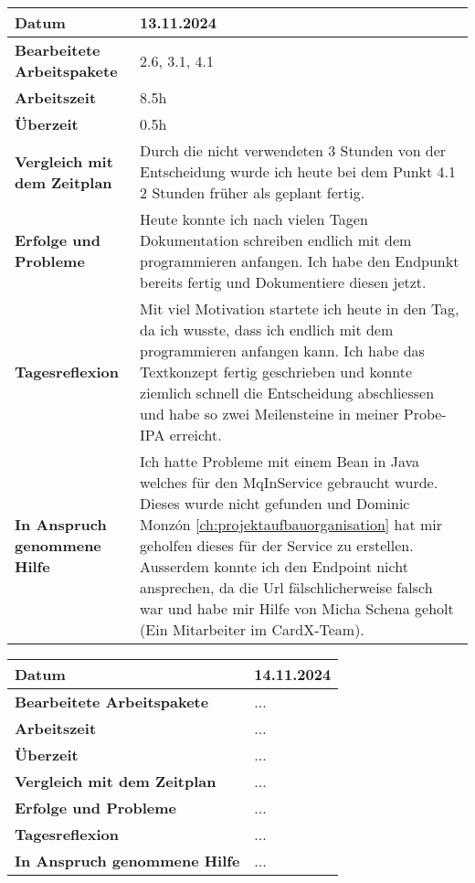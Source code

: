 \begin{longtable}{p{}|p{}}
	\hline
	\textbf{Datum}                       & 13.11.2024            \\
	\hline
	\textbf{Bearbeitete Arbeitspakete}   & 2.6, 3.1, 4.1                  \\
	\hline
	\textbf{Arbeitszeit}                 & 8.5h                                    \\
	\hline
	\textbf{Überzeit}                    & 0.5h                                    \\
	\hline
	\textbf{Vergleich mit dem Zeitplan}  & Durch die nicht verwendeten 3 Stunden von der Entscheidung wurde ich heute bei dem Punkt 4.1 2 Stunden früher als geplant fertig. \\
	\hline
	\textbf{Erfolge und Probleme} & Heute konnte ich nach vielen Tagen Dokumentation schreiben endlich mit dem programmieren anfangen. Ich habe den Endpunkt bereits fertig und Dokumentiere diesen jetzt.
	\\
	\hline
	\textbf{Tagesreflexion} & Mit viel Motivation startete ich heute in den Tag, da ich wusste, dass ich endlich mit dem programmieren anfangen kann. Ich habe das Textkonzept fertig geschrieben und konnte ziemlich schnell die Entscheidung abschliessen und habe so zwei Meilensteine in meiner Probe-IPA erreicht.
	\\
	\hline
	\textbf{In Anspruch genommene Hilfe} & Ich hatte Probleme mit einem Bean in Java welches für den MqInService gebraucht wurde. Dieses wurde nicht gefunden und Dominic Monzón \ref{ch:projektaufbauorganisation} hat mir geholfen dieses für der Service zu erstellen. Ausserdem konnte ich den Endpoint nicht ansprechen, da die Url fälschlicherweise falsch war und habe mir Hilfe von Micha Schena geholt (Ein Mitarbeiter im CardX-Team).                              \\
	\hline
\end{longtable}\label{tab:arbeitsprotokoll-13.11.2024}
\newpage

\begin{longtable}{p{}|p{}}
	\hline
	\textbf{Datum}                       & 14.11.2024            \\
	\hline
	\textbf{Bearbeitete Arbeitspakete}   & ...                  \\
	\hline
	\textbf{Arbeitszeit}                 & ...                                    \\
	\hline
	\textbf{Überzeit}                    & ...                                    \\
	\hline
	\textbf{Vergleich mit dem Zeitplan}  & ... \\
	\hline
	\textbf{Erfolge und Probleme} & ...
	\\
	\hline
	\textbf{Tagesreflexion} & ...
	\\
	\hline
	\textbf{In Anspruch genommene Hilfe} & ...                              \\
	\hline
\end{longtable}\label{tab:arbeitsprotokoll-14.11.2024}
\newpage

